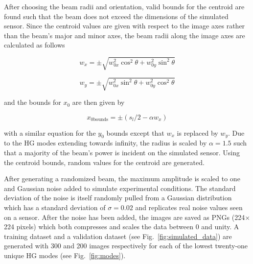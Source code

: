 \documentclass[10pt,journal,compsoc]{IEEEtran}
\begin{document}
After choosing the beam radii and orientation, valid bounds for the centroid are found such that the beam does not exceed the dimensions of the simulated sensor. Since the centroid values are given with respect to the image axes rather than the beam's major and minor axes, the beam radii along the image axes are calculated as follows

\begin{equation}
w_x=\pm\sqrt{w_{0x}^2\cos^2\theta+w_{0y}^2\sin^2\theta}
\end{equation}

\begin{equation}
w_y=\pm\sqrt{w_{0x}^2\sin^2\theta+w_{0y}^2\cos^2\theta}
\end{equation}

\noindent and the bounds for $x_0$ are then given by

\begin{equation}
x_{0\text{bounds}}=\pm\left(s_l/2-\alpha w_x\right)
\end{equation}


\noindent with a similar equation for the $y_0$ bounds except that $w_x$ is replaced by $w_y$. Due to the HG modes extending towards infinity, the radius is scaled by $\alpha=1.5$ such that a majority of the beam's power is incident on the simulated sensor. Using the centroid bounds, random values for the centroid are generated.

After generating a randomized beam, the maximum amplitude is scaled to one and Gaussian noise added to simulate experimental conditions. The standard deviation of the noise is itself randomly pulled from a Gaussian distribution which has a standard deviation of $\sigma=0.02$ and replicates real noise values seen on a sensor. After the noise has been added, the images are saved as PNGs (224$\times$224 pixels) which both compresses and scales the data between 0 and unity. A training dataset and a validation dataset (see Fig.~\ref{fig:simulated_data}) are generated with 300 and 200 images respectively for each of the lowest twenty-one unique HG modes (see Fig.~\ref{fig:modes}).
\end{document}
